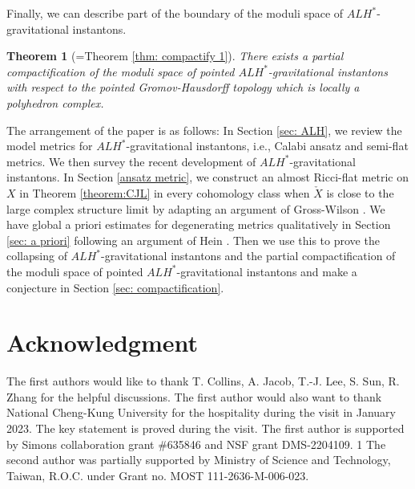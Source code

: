 \documentclass[11pt]{amsart}
\theoremstyle{plain}
\newtheorem{thm}{Theorem}[section]
\theoremstyle{definition}
\numberwithin{equation}{section}
\begin{document}
Finally, we can describe part of the boundary of the moduli space of $ALH^*$-gravitational instantons. 
\begin{thm}[=Theorem \ref{thm: compactify 1}]
	There exists a partial compactification of the moduli space of pointed $ALH^*$-gravitational instantons with respect to the pointed Gromov-Hausdorff topology which is locally a polyhedron complex. 
\end{thm}


The arrangement of the paper is as follows: In Section \ref{sec: ALH}, we review the model metrics for $ALH^*$-gravitational instantons, i.e., Calabi ansatz and semi-flat metrics. We then survey the recent development of $ALH^*$-gravitational instantons. In Section \ref{ansatz metric}, we construct an almost Ricci-flat metric on $X$ in Theorem \ref{theorem:CJL} in every cohomology class when $\check{X}$ is close to the large complex structure limit by adapting an argument of Gross-Wilson \cite{GW}. We have global a priori estimates for degenerating metrics qualitatively in Section \ref{sec: a priori} following an argument of Hein \cite{Hein}. Then we use this to prove the collapsing of $ALH^*$-gravitational instantons and the partial compactification of the moduli space of pointed $ALH^*$-gravitational instantons and make a conjecture in Section \ref{sec: compactification}. 











\section*{Acknowledgment}
  The first authors would like to thank T. Collins, A. Jacob, T.-J. Lee, S. Sun, R. Zhang for the helpful discussions. The first author would also want to thank National Cheng-Kung University for the hospitality during the visit in January 2023. The key statement is proved during the visit. The first author is supported by Simons collaboration grant \#635846 and NSF grant DMS-2204109. 1 The second author was partially supported by Ministry of
Science and Technology, Taiwan, R.O.C. under Grant no. MOST 111-2636-M-006-023.
\end{document}
